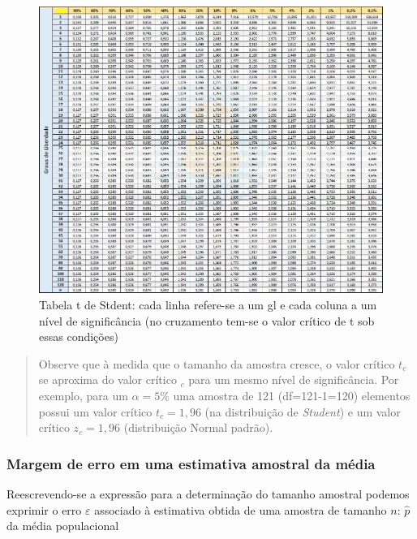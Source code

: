 \documentclass[
]{book}
\begin{document}
\hfill\break

\begin{figure}

{\centering \includegraphics[width=1\linewidth]{images7/tabela_t} 

}

\caption{Tabela t de Stdent: cada linha refere-se a um gl e cada coluna a um nível de significância (no cruzamento tem-se o valor crítico de t sob essas condições)}\label{fig:fig09}
\end{figure}

\begin{quote}
Observe que à medida que o tamanho da amostra cresce, o valor crítico \(t_{c}\) se aproxima do valor crítico \(_{c}\) para um mesmo nível de significância. Por exemplo, para um \(\alpha=5\%\) uma amostra de 121 (df=121-1=120) elementos possui um valor crítico \(t_{c}=1,96\) (na distribuição de \emph{Student}) e um valor crítico \(z_{c}=1,96\) (distribuição Normal padrão).
\end{quote}

\hypertarget{margem-de-erro-em-uma-estimativa-amostral-da-muxe9dia}{%
\subsubsection{Margem de erro em uma estimativa amostral da média}\label{margem-de-erro-em-uma-estimativa-amostral-da-muxe9dia}}

\hfill\break

Reescrevendo-se a expressão para a determinação do tamanho amostral podemos exprimir o erro \(\varepsilon\) associado à estimativa obtida de uma amostra de tamanho \(n\): \(\hat{p}\) da média populacional
\end{document}
